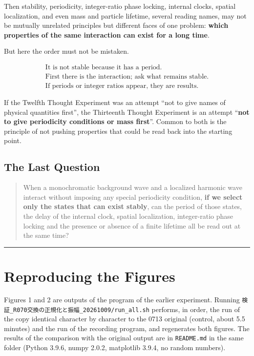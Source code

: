 \documentclass[
  a4paper,
]{article}
\begin{document}
Then stability, periodicity, integer-ratio phase locking, internal
clocks, spatial localization, and even mass and particle lifetime,
several reading names, may not be mutually unrelated principles but
different faces of one problem: \textbf{which properties of the same
interaction can exist for a long time}.

But here the order must not be mistaken.

\[
\boxed{\begin{array}{c}
\text{It is not stable because it has a period.}
\\
\text{First there is the interaction; ask what remains stable.}
\\
\text{If periods or integer ratios appear, they are results.}
\end{array}}
\]

If the Twelfth Thought Experiment was an attempt ``not to give names of
physical quantities first'', the Thirteenth Thought Experiment is an
attempt ``\textbf{not to give periodicity conditions or mass first}''.
Common to both is the principle of not pushing properties that could be
read back into the starting point.

\subsection{The Last Question}\label{the-last-question}

\begin{quote}
When a monochromatic background wave and a localized harmonic wave
interact without imposing any special periodicity condition, \textbf{if
we select only the states that can exist stably}, can the period of
those states, the delay of the internal clock, spatial localization,
integer-ratio phase locking and the presence or absence of a finite
lifetime all be read out at the same time?
\end{quote}

\begin{center}\rule{0.5\linewidth}{0.5pt}\end{center}

\section{Reproducing the Figures}\label{reproducing-the-figures}

Figures 1 and 2 are outputs of the program of the earlier experiment.
Running \texttt{検証\_\allowbreak{}R070交換の正規化と振幅\_\allowbreak{}20261009/\allowbreak{}run\_\allowbreak{}all.sh}
performs, in order, the run of the copy identical character by character
to the 0713 original (control, about 5.5 minutes) and the run of the
recording program, and regenerates both figures. The results of the
comparison with the original output are in \texttt{README.md} in the
same folder (Python 3.9.6, numpy 2.0.2, matplotlib 3.9.4, no random
numbers).
\end{document}
